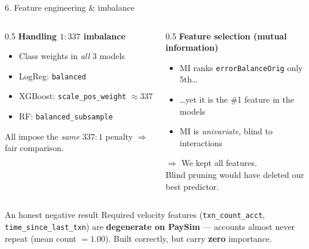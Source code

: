 \documentclass[aspectratio=169]{beamer}
\begin{document}
\begin{frame}{6. Feature engineering \& imbalance}
\begin{columns}[T]
\begin{column}{0.5\textwidth}
\textbf{Handling $1{:}337$ imbalance}
\begin{itemize}
    \item Class weights in \emph{all} 3 models
    \item LogReg: \texttt{balanced}
    \item XGBoost: \texttt{scale\_pos\_weight} $\approx 337$
    \item RF: \texttt{balanced\_subsample}
\end{itemize}
\footnotesize All impose the \emph{same} $337{:}1$ penalty $\Rightarrow$ fair comparison.
\end{column}
\begin{column}{0.5\textwidth}
\textbf{Feature selection (mutual information)}
\begin{itemize}
    \item MI ranks \texttt{errorBalanceOrig} only 5th\ldots
    \item \ldots yet it is the \#1 feature in the models
    \item MI is \emph{univariate}, blind to interactions
\end{itemize}
\alert{$\Rightarrow$ We kept all features.}\\
\footnotesize Blind pruning would have deleted our best predictor.
\end{column}
\end{columns}

\vspace{0.8em}
\begin{block}{An honest negative result}
Required velocity features (\texttt{txn\_count\_acct},
\texttt{time\_since\_last\_txn}) are \textbf{degenerate on PaySim} ---
accounts almost never repeat (mean count $= 1.00$).
Built correctly, but carry \textbf{zero} importance.
\end{block}
\end{frame}
\end{document}
